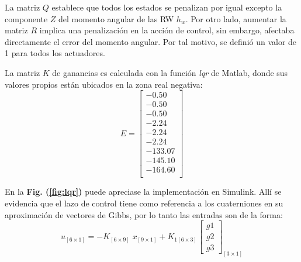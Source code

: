 La matriz $Q$ establece que todos los estados se penalizan por igual excepto la componente $Z$ del momento angular de las RW $h_w$. Por otro lado, aumentar la matriz $R$ implica una penalización en la acción de control, sin embargo, afectaba directamente el error del momento angular. Por tal motivo, se definió un valor de 1 para todos los actuadores.

La matriz $K$ de ganancias es calculada con la función \textit{lqr} de Matlab, donde sus valores propios están ubicados en la zona real negativa:
\begin{equation}
	E =
	\begin{bmatrix}
		-0.50 \\
		-0.50 \\
		-0.50 \\
		-2.24 \\
		-2.24 \\
		-2.24 \\
		-133.07 \\
		-145.10 \\
		-164.60 \\
	\end{bmatrix}
\end{equation}

En la \textbf{Fig. (\ref{fig:lqr})} puede apreciase la implementación en Simulink. Allí se evidencia que el lazo de control tiene como referencia a los cuaterniones en su aproximación de vectores de Gibbs, por lo tanto las entradas son de la forma:
\begin{equation}\label{eq:expresionEntradas}
	u_{[6\times1]} =-K_{[6\times9]}\;x_{[9\times1]} +K_{1[6\times3]}\left[\begin{array}{c}
		g1\\
		g2\\
		g3
	\end{array}\right]_{[3\times1]}
\end{equation}

